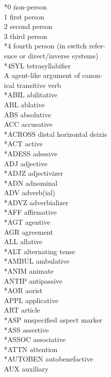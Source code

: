 \documentclass[a4paper, 11pt]{book}
\begin{document}
\begin{multicols}{2}
	\begin{tabbing}
	*0 \hspace{2cm} \= non-person \\
	1 \> first person \\
	2 \> second person \\
	3 \> third person \\
	*4 \> fourth person (in switch refer-\\
		\> ence or direct/inverse systems) \\
	*4SYL \> tetrasyllabifier \\
	A \> agent-like argument of canon- \\
		\> ical transitive verb \\
	*ABIL \> abilitative \\
	ABL \> ablative \\
	ABS \> absolutive \\
	ACC \> accusative \\
	*ACROSS \> distal horizontal deixis \\
	*ACT \> active \\
	*ADESS \> adessive \\
	ADJ \> adjective \\
	*ADJZ \> adjectivizer \\
	*ADN \> adnominal \\
	ADV \> adverb(ial) \\
	*ADVZ \> adverbializer \\
	*AFF \> affirmative \\
	*AGT \> agentive \\
	AGR \> agreement \\
	ALL \> allative \\
	*ALT \> alternating tense \\
	*AMBUL \> ambulative \\
	*ANIM \> animate \\
	ANTIP \> antipassive \\
	*AOR \> aorist \\
	APPL \> applicative \\
	ART \> article \\
	*ASP \> unspecified aspect marker \\
	*ASS \> assertive \\
	*ASSOC \> associative \\
	*ATTN \> attention \\
	*AUTOBEN \> autobenefactive \\
	AUX \> auxiliary \\

\end{tabbing}
\end{multicols}
\end{document}
